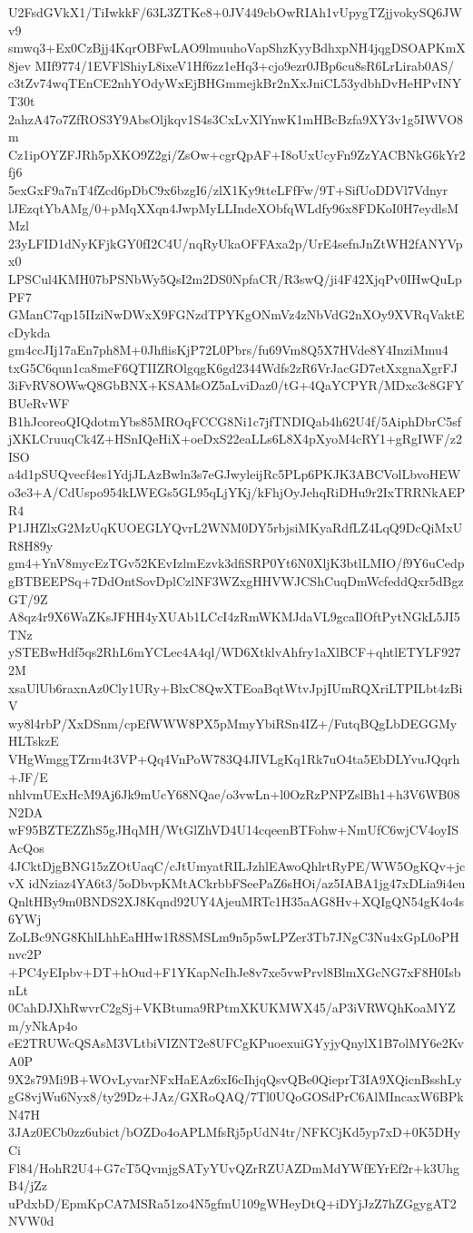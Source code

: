 U2FsdGVkX1/TiIwkkF/63L3ZTKe8+0JV449cbOwRIAh1vUpygTZjjvokySQ6JWv9
smwq3+Ex0CzBjj4KqrOBFwLAO9lmuuhoVapShzKyyBdhxpNH4jqgDSOAPKmX8jev
MIf9774/1EVFlShiyL8ixeV1Hf6zz1eHq3+cjo9ezr0JBp6cu8sR6LrLirab0AS/
c3tZv74wqTEnCE2nhYOdyWxEjBHGmmejkBr2nXxJniCL53ydbhDvHeHPvINYT30t
2ahzA47o7ZfROS3Y9AbsOljkqv1S4s3CxLvXlYnwK1mHBcBzfa9XY3v1g5IWVO8m
Cz1ipOYZFJRh5pXKO9Z2gi/ZsOw+cgrQpAF+I8oUxUcyFn9ZzYACBNkG6kYr2fj6
5exGxF9a7nT4fZcd6pDbC9x6bzgI6/zlX1Ky9tteLFfFw/9T+SifUoDDVl7Vdnyr
lJEzqtYbAMg/0+pMqXXqn4JwpMyLLIndeXObfqWLdfy96x8FDKoI0H7eydlsMMzl
23yLFID1dNyKFjkGY0fI2C4U/nqRyUkaOFFAxa2p/UrE4sefnJnZtWH2fANYVpx0
LPSCul4KMH07bPSNbWy5QsI2m2DS0NpfaCR/R3swQ/ji4F42XjqPv0IHwQuLpPF7
GManC7qp15IIziNwDWxX9FGNzdTPYKgONmVz4zNbVdG2nXOy9XVRqVaktEcDykda
gm4ccJIj17aEn7ph8M+0JhflisKjP72L0Pbrs/fu69Vm8Q5X7HVde8Y4InziMmu4
txG5C6qun1ca8meF6QTIIZROlgqgK6gd2344Wdfs2zR6VrJacGD7etXxgnaXgrFJ
3iFvRV8OWwQ8GbBNX+KSAMsOZ5aLviDaz0/tG+4QaYCPYR/MDxc3c8GFYBUeRvWF
B1hJcoreoQIQdotmYbs85MROqFCCG8Ni1c7jfTNDIQab4h62U4f/5AiphDbrC5sf
jXKLCruuqCk4Z+HSnIQeHiX+oeDxS22eaLLs6L8X4pXyoM4cRY1+gRgIWF/z2ISO
a4d1pSUQvecf4es1YdjJLAzBwln3s7eGJwyleijRc5PLp6PKJK3ABCVolLbvoHEW
o3e3+A/CdUspo954kLWEGs5GL95qLjYKj/kFhjOyJehqRiDHu9r2IxTRRNkAEPR4
P1JHZlxG2MzUqKUOEGLYQvrL2WNM0DY5rbjsiMKyaRdfLZ4LqQ9DcQiMxUR8H89y
gm4+YnV8mycEzTGv52KEvIzlmEzvk3dfiSRP0Yt6N0XljK3btlLMIO/f9Y6uCedp
gBTBEEPSq+7DdOntSovDplCzlNF3WZxgHHVWJCShCuqDmWcfeddQxr5dBgzGT/9Z
A8qz4r9X6WaZKsJFHH4yXUAb1LCcI4zRmWKMJdaVL9gcaIlOftPytNGkL5JI5TNz
ySTEBwHdf5qs2RhL6mYCLec4A4ql/WD6XtklvAhfry1aXlBCF+qhtlETYLF9272M
xsaUlUb6raxnAz0Cly1URy+BlxC8QwXTEoaBqtWtvJpjIUmRQXriLTPILbt4zBiV
wy8l4rbP/XxDSnm/cpEfWWW8PX5pMmyYbiRSn4IZ+/FutqBQgLbDEGGMyHLTskzE
VHgWmggTZrm4t3VP+Qq4VnPoW783Q4JIVLgKq1Rk7uO4ta5EbDLYvuJQqrh+JF/E
nhlvmUExHcM9Aj6Jk9mUcY68NQae/o3vwLn+l0OzRzPNPZslBh1+h3V6WB08N2DA
wF95BZTEZZhS5gJHqMH/WtGlZhVD4U14cqeenBTFohw+NmUfC6wjCV4oyISAcQos
4JCktDjgBNG15zZOtUaqC/cJtUmyatRILJzhlEAwoQhlrtRyPE/WW5OgKQv+jcvX
idNziaz4YA6t3/5oDbvpKMtACkrbbFSeePaZ6sHOi/az5IABA1jg47xDLia9i4eu
QnltHBy9m0BNDS2XJ8Kqnd92UY4AjeuMRTc1H35aAG8Hv+XQIgQN54gK4o4s6YWj
ZoLBc9NG8KhlLhhEaHHw1R8SMSLm9n5p5wLPZer3Tb7JNgC3Nu4xGpL0oPHnvc2P
+PC4yEIpbv+DT+hOud+F1YKapNcIhJe8v7xe5vwPrvl8BlmXGcNG7xF8H0IsbnLt
0CahDJXhRwvrC2gSj+VKBtuma9RPtmXKUKMWX45/aP3iVRWQhKoaMYZm/yNkAp4o
eE2TRUWcQSAsM3VLtbiVIZNT2e8UFCgKPuoexuiGYyjyQnylX1B7olMY6e2KvA0P
9X2s79Mi9B+WOvLyvarNFxHaEAz6xI6cIhjqQsvQBe0QieprT3IA9XQicnBsshLy
gG8vjWu6Nyx8/ty29Dz+JAz/GXRoQAQ/7Tl0UQoGOSdPrC6AlMIncaxW6BPkN47H
3JAz0ECb0zz6ubict/bOZDo4oAPLMfsRj5pUdN4tr/NFKCjKd5yp7xD+0K5DHyCi
Fl84/HohR2U4+G7cT5QvmjgSATyYUvQZrRZUAZDmMdYWfEYrEf2r+k3UhgB4/jZz
uPdxbD/EpmKpCA7MSRa51zo4N5gfmU109gWHeyDtQ+iDYjJzZ7hZGgygAT2NVW0d
